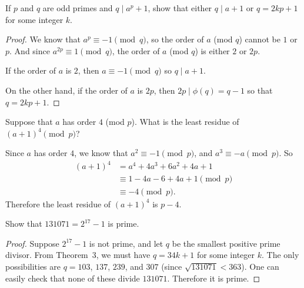  If $p$ and $q$ are odd primes and $q\mid a^p + 1$, show
that either $q\mid a + 1$ or $q = 2kp + 1$ for some integer $k$.
\begin{proof}
  We know that $a^p\equiv-1\pmod{q}$, so the order of $a$ (mod $q$)
  cannot be $1$ or $p$. And since $a^{2p}\equiv1\pmod{q}$, the order
  of $a$ (mod $q$) is either $2$ or $2p$.

  If the order of $a$ is $2$, then $a\equiv-1\pmod{q}$ so
  $q\mid a + 1$.

  On the other hand, if the order of $a$ is $2p$, then
  $2p\mid\phi(q) = q - 1$ so that $q = 2kp + 1$.
\end{proof}

 Suppose that $a$ has order $4$ (mod $p$). What is the
least residue of $(a + 1)^4\pmod{p}$?
\begin{solution}
  Since $a$ has order $4$, we know that $a^2\equiv-1\pmod{p}$, and
  $a^3\equiv-a\pmod{p}$. So
  \begin{align*}
    (a + 1)^4
    &= a^4 + 4a^3 + 6a^2 + 4a + 1 \\
    &\equiv 1 - 4a - 6 + 4a + 1 \pmod{p} \\
    &\equiv -4 \pmod{p}.
  \end{align*}
  Therefore the least residue of $(a + 1)^4$ is $p - 4$.
\end{solution}

 Show that $131071 = 2^{17} - 1$ is prime.
\begin{proof}
  Suppose $2^{17} - 1$ is not prime, and let $q$ be the smallest
  positive prime divisor. From Theorem~3, we must have $q = 34k + 1$
  for some integer $k$. The only possibilities are $q = 103$, $137$,
  $239$, and $307$ (since $\sqrt{131071}<363$). One can easily check
  that none of these divide $131071$. Therefore it is prime.
\end{proof}

